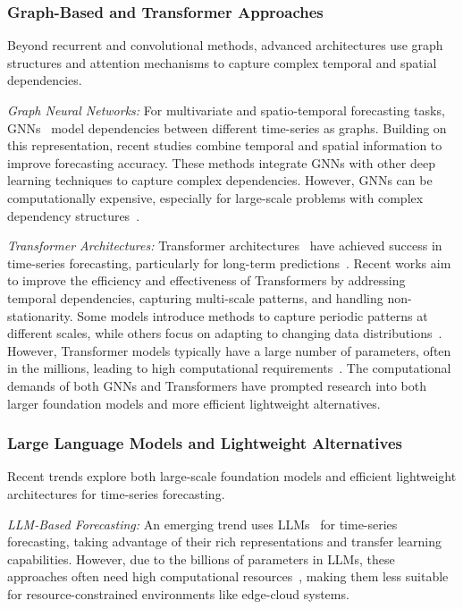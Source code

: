 \subsubsection{Graph-Based and Transformer Approaches}

Beyond recurrent and convolutional methods, advanced architectures use graph structures and attention mechanisms to capture complex temporal and spatial dependencies.

\textit{Graph Neural Networks:} For multivariate and spatio-temporal forecasting tasks, \acp{GNN}~\cite{yi2024fouriergnn, zhang2024irregular} model dependencies between different time-series as graphs. Building on this representation, recent studies combine temporal and spatial information to improve forecasting accuracy. These methods integrate \acp{GNN} with other deep learning techniques to capture complex dependencies. However, \acp{GNN} can be computationally expensive, especially for large-scale problems with complex dependency structures~\cite{jin2024survey}.

\textit{Transformer Architectures:} Transformer architectures~\cite{wu2023timesnettemporal2dvariationmodeling} have achieved success in time-series forecasting, particularly for long-term predictions~\cite{vaswani2017attention}. Recent works aim to improve the efficiency and effectiveness of Transformers by addressing temporal dependencies, capturing multi-scale patterns, and handling non-stationarity. Some models introduce methods to capture periodic patterns at different scales, while others focus on adapting to changing data distributions~\cite{jia2024witran}. However, Transformer models typically have a large number of parameters, often in the millions, leading to high computational requirements~\cite{liu2023nonstationary}. The computational demands of both \acp{GNN} and Transformers have prompted research into both larger foundation models and more efficient lightweight alternatives.

\subsubsection{Large Language Models and Lightweight Alternatives}

Recent trends explore both large-scale foundation models and efficient lightweight architectures for time-series forecasting.

\textit{\ac{LLM}-Based Forecasting:} An emerging trend uses \acp{LLM}~\cite{tang2023one, liu2023large} for time-series forecasting, taking advantage of their rich representations and transfer learning capabilities. However, due to the billions of parameters in \acp{LLM}, these approaches often need high computational resources~\cite{rasul2023forecasting}, making them less suitable for resource-constrained environments like edge-cloud systems.


